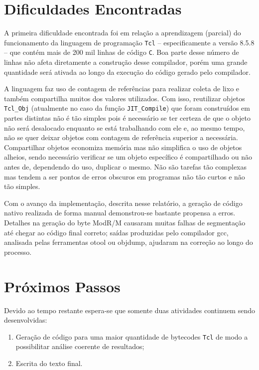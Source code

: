 \section{Dificuldades Encontradas}

A primeira dificuldade encontrada foi em relação a aprendizagem
(parcial) do funcionamento da linguagem de programação \texttt{Tcl} --
especificamente a versão 8.5.8 --
que contém mais de 200 mil linhas de código \texttt{C}. Boa parte
desse número de linhas não afeta diretamente a construção desse
compilador, porém uma grande quantidade será ativada
ao longo da execução do código gerado pelo compilador.

A linguagem faz uso de contagem de referências para realizar coleta de
lixo e também compartilha muitos dos valores utilizados. Com isso,
reutilizar objetos \verb!Tcl_Obj! (atualmente no caso da função
\verb!JIT_Compile!) que foram construídos em partes distintas não é tão
simples pois é necessário se ter certeza de que o objeto não será
desalocado enquanto se está trabalhando com ele e, ao mesmo tempo, não
se quer deixar objetos com contagem de referência superior a
necessária. Compartilhar objetos economiza memória mas não simplifica
o uso de objetos alheios, sendo necessário verificar se um objeto
específico é compartilhado ou não antes de, dependendo do uso,
duplicar o mesmo. Não são tarefas tão complexas mas tendem a ser
pontos de erros obscuros em programas não tão curtos e não tão simples.

Com o avanço da implementação, descrita nesse relatório, a geração de
código nativo realizada de forma manual demonstrou-se bastante
propensa a erros. Detalhes na geração do byte ModR/M causaram muitas
falhas de segmentação até chegar ao código final correto; saídas
produzidas pelo compilador gcc, analisada pelas ferramentas otool ou
objdump, ajudaram na correção ao longo do processo.

\section{Próximos Passos}

Devido ao tempo restante espera-se que somente duas atividades
continuem sendo desenvolvidas:
\begin{enumerate}
\item Geração de código para uma maior quantidade de bytecodes
  \texttt{Tcl} de modo a possibilitar análise coerente de resultados;
\item Escrita do texto final.
\end{enumerate}

